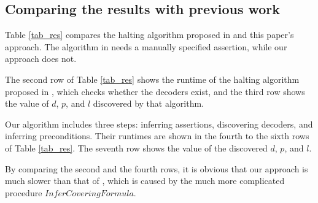 \documentclass[journal]{IEEEtran}
\begin{document}
\subsection{Comparing the results with previous work}



Table \ref{tab_res} compares the halting algorithm proposed in \cite{ShengYuShen:tcad11} and this paper's approach.
The algorithm in \cite{ShengYuShen:tcad11} needs a manually specified assertion,
while our approach does not.

The second row of Table \ref{tab_res} shows the runtime of
the halting algorithm proposed in \cite{ShengYuShen:tcad11},
which checks whether the decoders exist,
and the third row shows the value of $d$, $p$, and $l$ discovered by that algorithm.

Our algorithm includes three steps:
inferring assertions,
discovering decoders,
and inferring preconditions.
Their runtimes are shown in
the fourth to the sixth rows of Table \ref{tab_res}.
The seventh row shows the value of the discovered $d$, $p$, and $l$.

By comparing the second and the fourth rows,
it is obvious that our approach is much slower than that of \cite{ShengYuShen:tcad11},
which is caused by the much more complicated procedure $InferCoveringFormula$.
\end{document}
